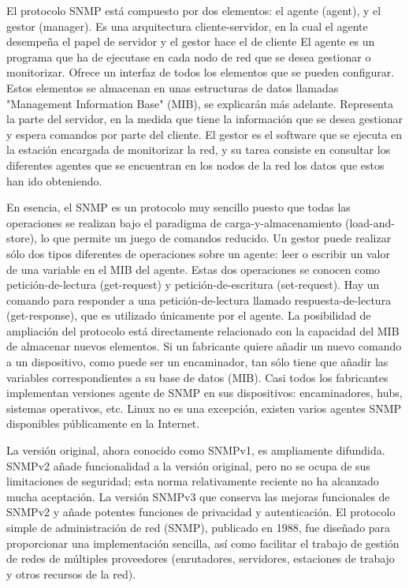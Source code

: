 \noindent
\newline
El protocolo SNMP está compuesto por dos elementos: el agente (agent), y el gestor (manager). Es una arquitectura cliente-servidor, en la cual el agente desempeña el papel de servidor y el gestor hace el de cliente
\noindent
El agente es un programa que ha de ejecutase en cada nodo de red que se desea gestionar o monitorizar. Ofrece un interfaz de todos los elementos que se pueden configurar. Estos elementos se almacenan en unas estructuras de datos llamadas "Management Information Base" (MIB), se explicarán más adelante. Representa la parte del servidor, en la medida que tiene la información que se desea gestionar y espera comandos por parte del cliente.
\noindent
El gestor es el software que se ejecuta en la estación encargada de monitorizar la red, y su tarea consiste en consultar los diferentes agentes que se encuentran en los nodos de la red los datos que estos han ido obteniendo.

\noindent
\newline
En esencia, el SNMP es un protocolo muy sencillo puesto que todas las operaciones se realizan bajo el paradigma de carga-y-almacenamiento (load-and-store), lo que permite un juego de comandos reducido. Un gestor puede realizar sólo dos tipos diferentes de operaciones sobre un agente: leer o escribir un valor de una variable en el MIB del agente. Estas dos operaciones se conocen como petición-de-lectura (get-request) y petición-de-escritura (set-request). Hay un comando para responder a una petición-de-lectura llamado respuesta-de-lectura (get-response), que es utilizado únicamente por el agente.
\noindent
La posibilidad de ampliación del protocolo está directamente relacionado con la capacidad del MIB de almacenar nuevos elementos. Si un fabricante quiere añadir un nuevo comando a un dispositivo, como puede ser un encaminador, tan sólo tiene que añadir las variables correspondientes a su base de datos (MIB).
\noindent
Casi todos los fabricantes implementan versiones agente de SNMP en sus dispositivos: encaminadores, hubs, sistemas operativos, etc. Linux no es una excepción, existen varios agentes SNMP disponibles públicamente en la Internet. \cite{intro_snmp}

\noindent	
\newline
La versión original, ahora conocido como SNMPv1, es ampliamente difundida. SNMPv2 añade funcionalidad a la versión original, pero no se ocupa de sus limitaciones de seguridad; esta norma relativamente reciente no ha alcanzado mucha aceptación. La versión SNMPv3 que conserva las mejoras funcionales de SNMPv2 y añade potentes funciones de privacidad y autenticación.
El protocolo simple de administración de red (SNMP), publicado en 1988, fue diseñado para proporcionar una implementación sencilla, así como facilitar el trabajo de gestión de redes de múltiples proveedores (enrutadores, servidores, estaciones de trabajo y otros recursos de la red). 

